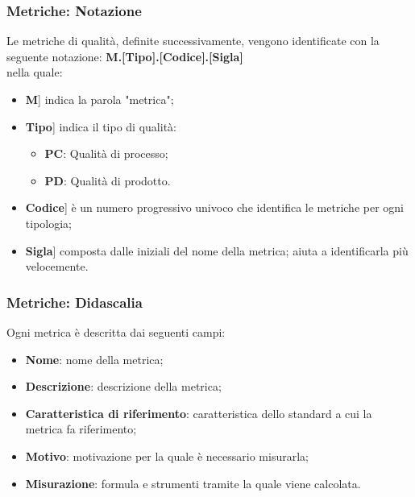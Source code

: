\documentclass[10pt, a4paper]{article}
\begin{document}
\subsubsection{Metriche: Notazione}
Le metriche di qualità, definite successivamente, vengono identificate con la seguente notazione:
\textbf{M.[Tipo].[Codice].[Sigla]}\\
nella quale:
\begin{itemize}
\item \lbrack \textbf{M}] indica la parola "metrica";
\item \lbrack \textbf{Tipo}] indica il tipo di qualità:
\begin{itemize}
    \item \textbf{PC}: Qualità di processo;
    \item \textbf{PD}: Qualità di prodotto.
\end{itemize}
\item \lbrack \textbf{Codice}] è un numero progressivo univoco che identifica le metriche per ogni tipologia;
\item \lbrack \textbf{Sigla}] composta dalle iniziali del nome della metrica; aiuta a identificarla più velocemente.
\end{itemize}

\subsubsection{Metriche: Didascalia}
Ogni metrica è descritta dai seguenti campi:
\begin{itemize}
    \item \textbf{Nome}: nome della metrica;
    \item \textbf{Descrizione}: descrizione della metrica;
    \item \textbf{Caratteristica di riferimento}: caratteristica dello standard a cui la metrica fa riferimento;
    \item \textbf{Motivo}: motivazione per la quale è necessario misurarla;
    \item \textbf{Misurazione}: formula e strumenti tramite la quale viene calcolata.
\end{itemize}
\end{document}
